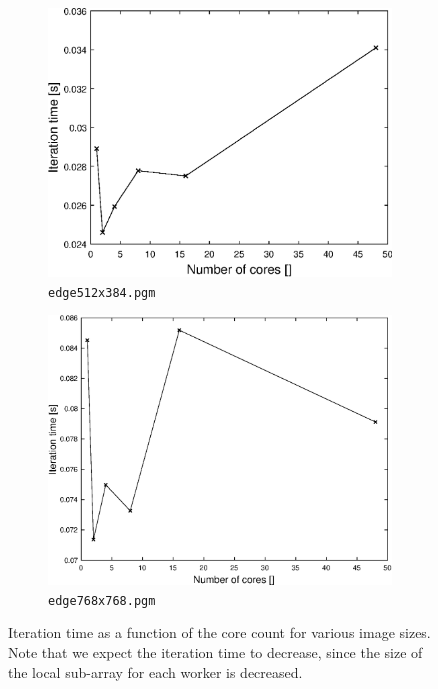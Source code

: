 \documentclass{article} %
\begin{document}
\begin{figure}
\begin{subfigure}[b]{.4\textwidth}
    \centering
    \includegraphics[width=\textwidth]{figures/cores_itertime_384.eps}
    \caption{\texttt{edge512x384.pgm}}
    \label{fig:coretime512}
\end{subfigure}
\hfill
\begin{subfigure}[b]{.4\textwidth}
    \centering
    \includegraphics[width=\textwidth]{figures/cores_itertime_768.eps}
    \caption{\texttt{edge768x768.pgm}}
    \label{fig:coretime768}
\end{subfigure}
\caption{Iteration time as a function of the core count for various image sizes. Note that we expect the iteration time to decrease, since the size of the local sub-array for each worker is decreased.}
\label{f:coretime}
\end{figure}
\end{document}
